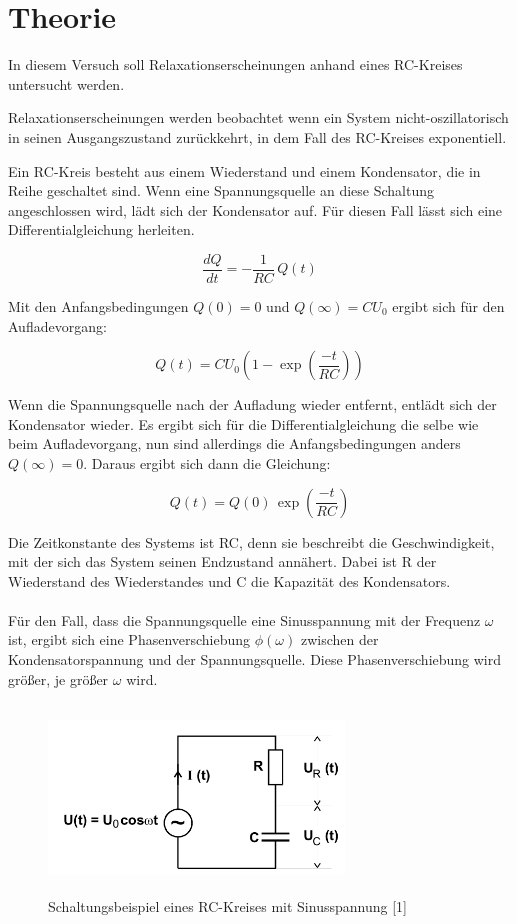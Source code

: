 \section{Theorie}

In diesem Versuch soll Relaxationserscheinungen anhand eines RC-Kreises untersucht
werden.

Relaxationserscheinungen werden beobachtet wenn ein System nicht-oszillatorisch
in seinen Ausgangszustand zurückkehrt, in dem Fall des RC-Kreises exponentiell.

Ein RC-Kreis besteht aus einem Wiederstand und einem Kondensator, die in Reihe
geschaltet sind. Wenn eine Spannungsquelle an diese Schaltung angeschlossen wird,
lädt sich der Kondensator auf. Für diesen Fall lässt sich eine Differentialgleichung
herleiten.

\begin{equation}
  \frac{dQ}{dt} = -\frac{1}{RC}\, Q(t)
\end{equation}

Mit den Anfangsbedingungen $Q(0)=0$ und $Q(\infty)= CU_0$ ergibt sich für den Aufladevorgang:

\begin{equation}
  Q(t) = CU_0 \left(1 - \exp\left(\frac{-t}{RC}\right)\right)
\end{equation}

Wenn die Spannungsquelle nach der Aufladung wieder entfernt, entlädt sich der Kondensator
wieder. Es ergibt sich für die Differentialgleichung die selbe wie beim Aufladevorgang,
nun sind allerdings die Anfangsbedingungen anders $Q(\infty) = 0$. Daraus ergibt sich dann
die Gleichung:

\begin{equation}
  Q(t) = Q(0)\, \exp\left(\frac{-t}{RC}\right)
  \label{eq:1}
\end{equation}

Die Zeitkonstante des Systems ist RC, denn sie beschreibt die Geschwindigkeit, mit
der sich das System seinen Endzustand annähert. Dabei ist R der Wiederstand des Wiederstandes
und C die Kapazität des Kondensators.\\\\

Für den Fall, dass die Spannungsquelle eine Sinusspannung mit der Frequenz $\omega$
ist, ergibt sich eine Phasenverschiebung $\phi(\omega)$ zwischen der Kondensatorspannung
und der Spannungsquelle. Diese Phasenverschiebung wird größer, je größer $\omega$ wird.

\begin{figure}
  \centering
  \includegraphics[height=5cm, width=0.7\textwidth]{Schaltungsbeispiel.png}
  \caption{Schaltungsbeispiel eines RC-Kreises mit Sinusspannung [1]}
\end{figure}

